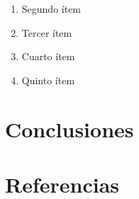 \documentclass{article}
\begin{document}
\begin{enumerate}[label=\roman*.]
    \item Segundo ítem
    
    
    
    \item Tercer ítem



    \item Cuarto ítem
    


    \item Quinto ítem



\end{enumerate}


\newpage
\part*{Conclusiones}

\newpage
\part*{Referencias}
\lipsum{}
\label{LastPage}    
\end{document}
